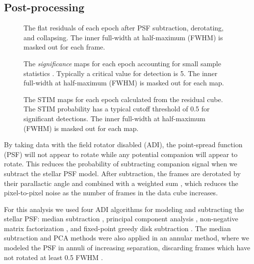 \documentclass[twocolumn]{aastex631}
\begin{document}
\subsection{Post-processing}

\begin{figure*}
    \centering
    \caption{The flat residuals of each epoch after PSF subtraction, derotating, and collapsing. The inner full-width at half-maximum (FWHM) is masked out for each frame.}
    \label{fig:residuals}
\end{figure*}

\begin{figure*}
    \centering
    \caption{The \textit{significance} maps for each epoch accounting for small sample statistics \citep{mawet_fundamental_2014}. Typically a critical value for detection is 5. The inner full-width at half-maximum (FWHM) is masked out for each map.}
    \label{fig:sig}
\end{figure*}

\begin{figure*}
    \centering
    \caption{The STIM maps for each epoch calculated from the residual cube. The STIM probability has a typical cutoff threshold of 0.5 for significant detections. The inner full-width at half-maximum (FWHM) is masked out for each map.}
    \label{fig:stim}
\end{figure*}

By taking data with the field rotator disabled (ADI), the point-spread function (PSF) will not appear to rotate while any potential companion will appear to rotate. This reduces the probability of subtracting companion signal when we subtract the stellar PSF model. After subtraction, the frames are derotated by their parallactic angle and combined with a weighted sum \citep{bottom_noise-weighted_2017}, which reduces the pixel-to-pixel noise as the number of frames in the data cube increases.

For this analysis we used four ADI algorithms for modeling and subtracting the stellar PSF: median subtraction \citep{marois_angular_2006}, principal component analysis \citep[PCA, also referred to as KLIP;][]{soummer_detection_2012}, non-negative matrix factorization \citep[NMF;][]{ren_non-negative_2018}, and fixed-point greedy disk subtraction \citep[GreeDS;][]{pairet_reference-less_2019,pairet_mayonnaise_2020}. The median subtraction and PCA methods were also applied in an annular method, where we modeled the PSF in annuli of increasing separation, discarding frames which have not rotated at least 0.5 FWHM \citep{marois_angular_2006}.
\end{document}
